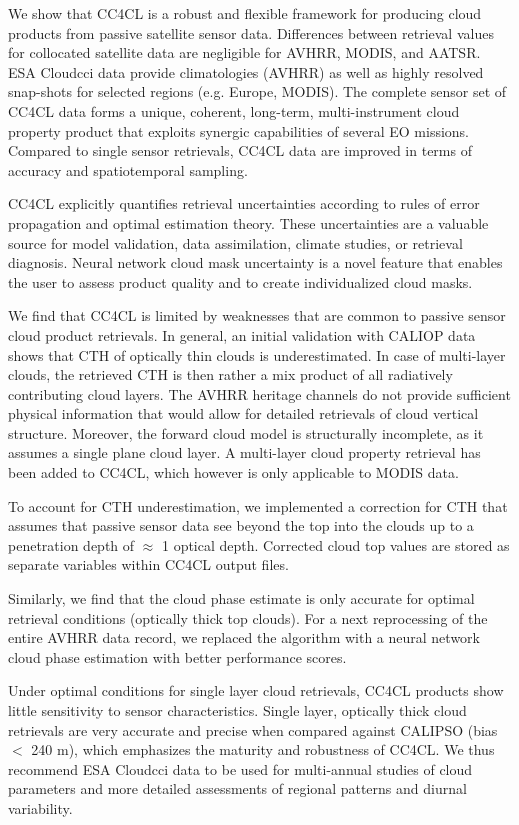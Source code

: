 \conclusions\label{conclusions}

We show that CC4CL is a robust and flexible framework for producing cloud products from passive satellite sensor data. Differences between retrieval values for collocated satellite data are negligible for AVHRR, MODIS, and AATSR. ESA Cloud\textunderscore cci data provide climatologies (AVHRR) as well as highly resolved snap-shots for selected regions (e.g. Europe, MODIS). The complete sensor set of CC4CL data forms a unique, coherent, long-term, multi-instrument cloud property product that exploits synergic capabilities of several EO missions. Compared to single sensor retrievals, CC4CL data are improved in terms of accuracy and spatiotemporal sampling.

CC4CL explicitly quantifies retrieval uncertainties according to rules of error propagation and optimal estimation theory. These uncertainties are a valuable source for model validation, data assimilation, climate studies, or retrieval diagnosis. Neural network cloud mask uncertainty is a novel feature that enables the user to assess product quality and to create individualized cloud masks.  %

We find that CC4CL is limited by weaknesses that are common to passive sensor cloud product retrievals. In general, an initial validation with CALIOP data shows that CTH of optically thin clouds is underestimated. In case of multi-layer clouds, the retrieved CTH is then rather a mix product of all radiatively contributing cloud layers. The AVHRR heritage channels do not provide sufficient physical information that would allow for detailed retrievals of cloud vertical structure. Moreover, the forward cloud model is structurally incomplete, as it assumes a single plane cloud layer. A multi-layer cloud property retrieval has been added to CC4CL, which however is only applicable to MODIS data. 

To account for CTH underestimation, we implemented a correction for CTH that assumes that passive sensor data see beyond the top into the clouds up to a penetration depth of $\approx$ 1 optical depth. Corrected cloud top values are stored as separate variables within CC4CL output files. 

Similarly, we find that the cloud phase estimate is only accurate for optimal retrieval conditions (optically thick top clouds). For a next reprocessing of the entire AVHRR data record, we replaced the \citet{Pavolonis05} algorithm with a neural network cloud phase estimation with better performance scores. 

Under optimal conditions for single layer cloud retrievals, CC4CL products show little sensitivity to sensor characteristics. Single layer, optically thick cloud retrievals are very accurate and precise when compared against CALIPSO (bias $<$ 240 m), which emphasizes the maturity and robustness of CC4CL. We thus recommend ESA Cloud\textunderscore cci data to be used for multi-annual studies of cloud parameters and more detailed assessments of regional patterns and diurnal variability.

